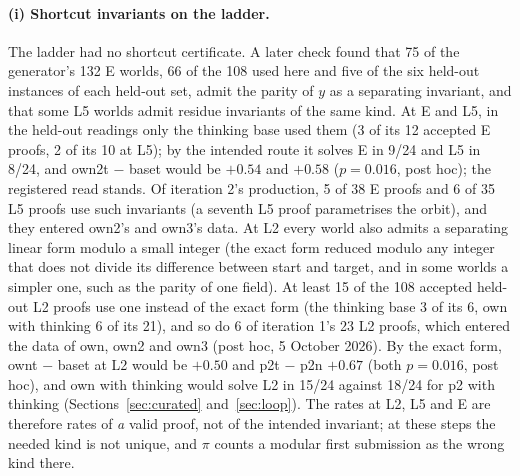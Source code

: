 \documentclass[11pt]{article}
\begin{document}
\paragraph{(i) Shortcut invariants on the ladder.} The ladder had no
shortcut certificate. A later check found that 75 of the generator's 132 E
worlds, 66 of the 108 used here and five of the six held-out instances of
each held-out set, admit the parity of $y$ as a separating invariant, and
that some L5 worlds admit residue invariants of the same kind. At E and
L5, in the held-out readings only the thinking base used them (3 of its 12
accepted E proofs, 2 of its 10 at L5); by the intended route it solves E
in 9/24 and L5 in 8/24, and own2t $-$ baset would be $+0.54$ and $+0.58$
($p=0.016$, post hoc); the registered read stands. Of iteration 2's
production, 5 of 38 E proofs and 6 of 35 L5 proofs use such invariants (a
seventh L5 proof parametrises the orbit), and they entered own2's and
own3's data. At L2 every world also admits a separating linear form modulo
a small integer (the exact form reduced modulo any integer that does not
divide its difference between start and target, and in some worlds a
simpler one, such as the parity of one field). At least 15 of the 108 accepted held-out L2 proofs use one
instead of the exact form (the thinking base 3 of its 6, own with thinking
6 of its 21), and so do 6 of iteration 1's 23 L2 proofs, which entered the
data of own, own2 and own3 (post hoc, 5 October 2026). By the exact form,
ownt $-$ baset at L2 would be $+0.50$ and p2t $-$ p2n $+0.67$ (both
$p=0.016$, post hoc), and own with thinking would solve L2 in 15/24 against
18/24 for p2 with thinking (Sections~\ref{sec:curated}
and~\ref{sec:loop}). The rates at L2, L5 and E are therefore rates of
\emph{a} valid proof, not of the intended invariant; at these steps the
needed kind is not unique, and $\pi$ counts a modular first submission as
the wrong kind there.
\end{document}
